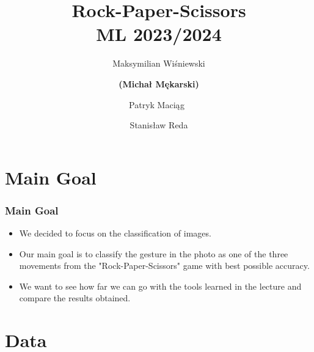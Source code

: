 \documentclass[aspectratio=169]{beamer}
\title{ \large{Rock-Paper-Scissors} \\ 
        \small{ML 2023/2024}}
\author{
    Maksymilian Wiśniewski \and
    \textbf{(Michał Mękarski)} \\ \and
    Patryk Maciąg  \and
    Stanisław Reda
}
\date{}
\begin{document}
\maketitle





\section{Main Goal}

\begin{frame}
    \frametitle{Main Goal}
    \begin{itemize}
        \item We decided to focus on the classification of images.

        \item Our main goal is to classify the gesture in the photo as one of the three movements from the "Rock-Paper-Scissors" game with best possible accuracy.

        \item We want to see how far we can go with the tools learned in the lecture and compare the results obtained.
        
    \end{itemize}

\end{frame}


\section{Data}
\end{document}
